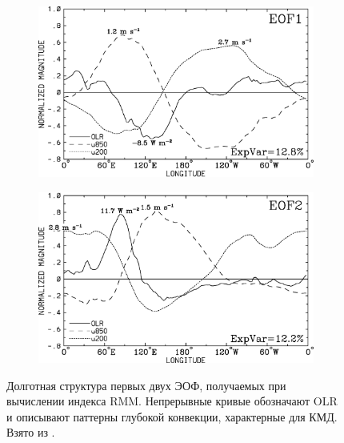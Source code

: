 \begin{figure}[t]  
    \centering
    \begin{subfigure}{.49\textwidth}
		\centering
		\includegraphics[width=\textwidth]{figures/wh04_fig1_eof1.png}
    \end{subfigure}
    \hfill
    \begin{subfigure}{.49\textwidth}
		\centering
		\includegraphics[width=\textwidth]{figures/wh04_fig1_eof2.png}
    \end{subfigure}
    \caption{Долготная структура первых двух ЭОФ, получаемых при вычислении индекса RMM. Непрерывные кривые обозначают OLR и описывают паттерны глубокой конвекции, характерные для КМД. Взято из \cite[рис. 1]{Wheeler_Hendon_2004}.}
	\label{fig:wh04_fig1}
\end{figure}

